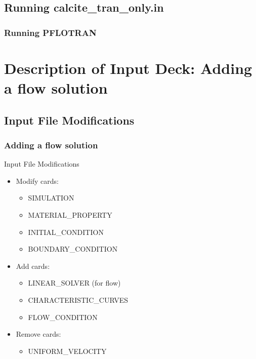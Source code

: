 \documentclass{beamer}
\begin{document}
\subsection{Running calcite_tran_only.in}

\begin{frame}[fragile]\frametitle{Running PFLOTRAN}


\end{frame}

\section{Description of Input Deck: Adding a flow solution}

\subsection{Input File Modifications}

\begin{frame}[fragile]\frametitle{Adding a flow solution}

Input File Modifications
\begin{itemize}
\item Modify cards:
  \begin{itemize}
    \item SIMULATION
    \item MATERIAL\_PROPERTY
    \item INITIAL\_CONDITION
    \item BOUNDARY\_CONDITION
   \end{itemize}
\item Add cards:
  \begin{itemize}
    \item LINEAR\_SOLVER (for flow)
    \item CHARACTERISTIC\_CURVES
    \item FLOW\_CONDITION
  \end{itemize}
\item Remove cards:
  \begin{itemize}
    \item UNIFORM\_VELOCITY
  \end{itemize}
\end{itemize}

\end{frame}
\end{document}
